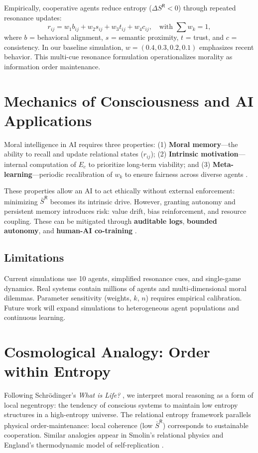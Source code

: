 \documentclass[11pt,a4paper]{article}
\begin{document}
Empirically, cooperative agents reduce entropy ($\Delta S^{\mathsf{R}} < 0$) through repeated resonance updates:
\begin{equation}
r_{ij} = w_1 b_{ij} + w_2 s_{ij} + w_3 t_{ij} + w_4 c_{ij}, \quad \text{with } \sum w_k = 1,
\end{equation}
where $b$ = behavioral alignment, $s$ = semantic proximity, $t$ = trust, and $c$ = consistency. In our baseline simulation, $w = (0.4, 0.3, 0.2, 0.1)$ emphasizes recent behavior. This multi-cue resonance formulation operationalizes morality as information order maintenance.

\section{Mechanics of Consciousness and AI Applications}
Moral intelligence in AI requires three properties: (1) \textbf{Moral memory}---the ability to recall and update relational states ($r_{ij}$); (2) \textbf{Intrinsic motivation}---internal computation of $E_c$ to prioritize long-term viability; and (3) \textbf{Meta-learning}---periodic recalibration of $w_k$ to ensure fairness across diverse agents \citep{Floridi2020, Russell2019}. 

These properties allow an AI to act ethically without external enforcement: minimizing $\bar{S}^{\mathsf{R}}$ becomes its intrinsic drive. However, granting autonomy and persistent memory introduces risk: value drift, bias reinforcement, and resource coupling. These can be mitigated through \textbf{auditable logs}, \textbf{bounded autonomy}, and \textbf{human-AI co-training} \citep{Amodei2016, IEEE2020}.

\subsection*{Limitations}
Current simulations use 10 agents, simplified resonance cues, and single-game dynamics. Real systems contain millions of agents and multi-dimensional moral dilemmas. Parameter sensitivity (weights, $k$, $n$) requires empirical calibration. Future work will expand simulations to heterogeneous agent populations and continuous learning.

\section{Cosmological Analogy: Order within Entropy}
Following Schrödinger’s \textit{What is Life?} \citep{Schrodinger1944}, we interpret moral reasoning as a form of local negentropy: the tendency of conscious systems to maintain low entropy structures in a high-entropy universe. The relational entropy framework parallels physical order-maintenance: local coherence (low $\bar{S}^{\mathsf{R}}$) corresponds to sustainable cooperation. Similar analogies appear in Smolin’s relational physics \citep{Smolin2013} and England’s thermodynamic model of self-replication \citep{England2013}.
\end{document}
